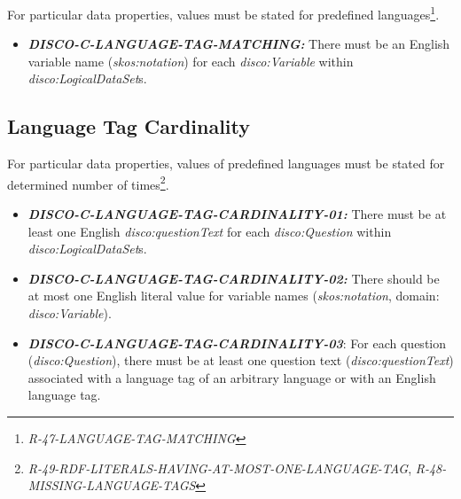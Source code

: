 \documentclass{llncs}
\begin{document}
For particular data properties, values must be stated for predefined languages\footnote{{\em R-47-LANGUAGE-TAG-MATCHING}}.

\begin{itemize}
	\item \textbf{{\em DISCO-C-LANGUAGE-TAG-MATCHING:}}
There must be an English variable name ({\em skos:notation}) for each {\em disco:Variable} within {\em disco:LogicalDataSet}s.
\end{itemize}

\subsection{Language Tag Cardinality}

For particular data properties, values of predefined languages must be stated for determined number of times\footnote{{\em R-49-RDF-LITERALS-HAVING-AT-MOST-ONE-LANGUAGE-TAG}, {\em R-48-MISSING-LANGUAGE-TAGS}}.

\begin{itemize}

	\item \textbf{{\em DISCO-C-LANGUAGE-TAG-CARDINALITY-01:}}
  There must be at least one English {\em disco:questionText} for each {\em disco:Question} within {\em disco:LogicalDataSet}s.

  \item \textbf{{\em DISCO-C-LANGUAGE-TAG-CARDINALITY-02:}}
  There should be at most one English literal value for variable names ({\em skos:notation}, domain: {\em disco:Variable}).

  \item \textbf{{\em DISCO-C-LANGUAGE-TAG-CARDINALITY-03}}:
	For each question (\emph{disco:Question}), there must be at least one question text (\emph{disco:questionText}) associated with a language tag of an arbitrary language or with an English language tag.

\end{itemize}
\end{document}
